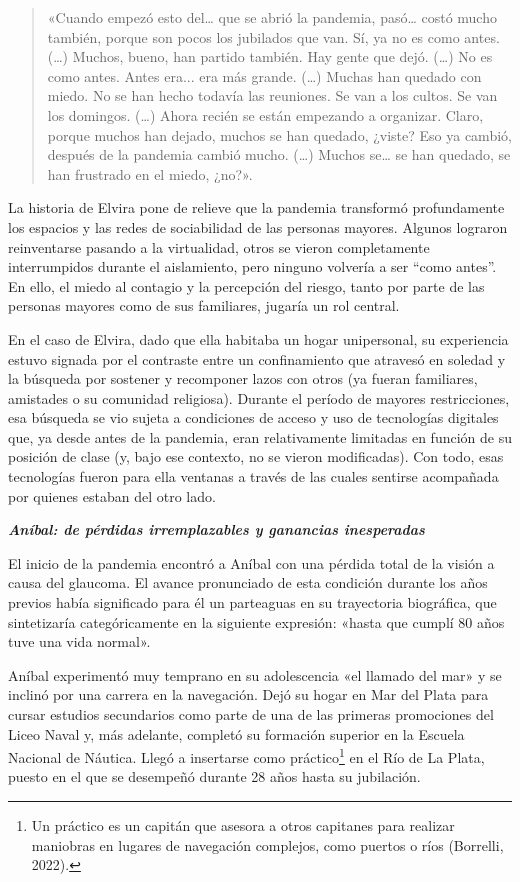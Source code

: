\begin{quote}
«Cuando empezó esto del\ldots{} que se abrió la pandemia, pasó\ldots{} costó mucho también, porque son pocos los jubilados que van. Sí, ya no es como antes. (\ldots) Muchos, bueno, han partido también. Hay gente que dejó. (\ldots) No es como antes. Antes era... era más grande. (\ldots) Muchas han quedado con miedo. No se han hecho todavía las reuniones. Se van a los cultos. Se van los domingos. (\ldots) Ahora recién se están empezando a organizar. Claro, porque muchos han dejado, muchos se han quedado, ¿viste? Eso ya cambió, después de la pandemia cambió mucho. (\ldots) Muchos se\ldots{} se han quedado, se han frustrado en el miedo, ¿no?».
\end{quote}

La historia de Elvira pone de relieve que la pandemia transformó profundamente los espacios y las redes de sociabilidad de las personas mayores. Algunos lograron reinventarse pasando a la virtualidad, otros se vieron completamente interrumpidos durante el aislamiento, pero ninguno volvería a ser ``como antes''. En ello, el miedo al contagio y la percepción del riesgo, tanto por parte de las personas mayores como de sus familiares, jugaría un rol central.

En el caso de Elvira, dado que ella habitaba un hogar unipersonal, su experiencia estuvo signada por el contraste entre un confinamiento que atravesó en soledad y la búsqueda por sostener y recomponer lazos con otros (ya fueran familiares, amistades o su comunidad religiosa). Durante el período de mayores restricciones, esa búsqueda se vio sujeta a condiciones de acceso y uso de tecnologías digitales que, ya desde antes de la pandemia, eran relativamente limitadas en función de su posición de clase (y, bajo ese contexto, no se vieron modificadas). Con todo, esas tecnologías fueron para ella ventanas a través de las cuales sentirse acompañada por quienes estaban del otro lado.

\emph{\textbf{Aníbal: de pérdidas irremplazables y ganancias inesperadas}}

El inicio de la pandemia encontró a Aníbal con una pérdida total de la visión a causa del glaucoma. El avance pronunciado de esta condición durante los años previos había significado para él un parteaguas en su trayectoria biográfica, que sintetizaría categóricamente en la siguiente expresión: «hasta que cumplí 80 años tuve una vida normal».

Aníbal experimentó muy temprano en su adolescencia «el llamado del mar» y se inclinó por una carrera en la navegación. Dejó su hogar en Mar del Plata para cursar estudios secundarios como parte de una de las primeras promociones del Liceo Naval y, más adelante, completó su formación superior en la Escuela Nacional de Náutica. Llegó a insertarse como práctico\footnote{Un práctico es un capitán que asesora a otros capitanes para realizar maniobras en lugares de navegación complejos, como puertos o ríos (Borrelli, 2022).} en el Río de La Plata, puesto en el que se desempeñó durante 28 años hasta su jubilación.


